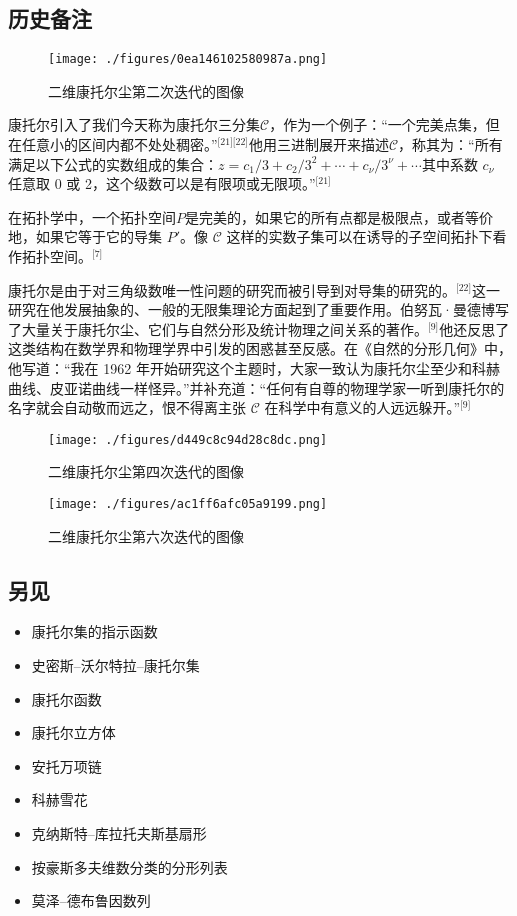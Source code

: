 \subsection{历史备注}
\begin{figure}[ht]
\centering
\texttt{[image: ./figures/0ea146102580987a.png]}
\caption{二维康托尔尘第二次迭代的图像} \label{fig_KTRJ_7}
\end{figure}
康托尔引入了我们今天称为康托尔三分集$\mathcal{C}$，作为一个例子：“一个完美点集，但在任意小的区间内都不处处稠密。”\(^\text{[21][22]}\)他用三进制展开来描述$\mathcal{C}$，称其为：“所有满足以下公式的实数组成的集合：$z = c_1/3 + c_2/3^2 + \cdots + c_\nu/3^\nu + \cdots$其中系数 $c_\nu$ 任意取 0 或 2，这个级数可以是有限项或无限项。”\(^\text{[21]}\)

在拓扑学中，一个拓扑空间$P$是完美的，如果它的所有点都是极限点，或者等价地，如果它等于它的导集 $P'$。像 $\mathcal{C}$ 这样的实数子集可以在诱导的子空间拓扑下看作拓扑空间。\(^\text{[7]}\)

康托尔是由于对三角级数唯一性问题的研究而被引导到对导集的研究的。\(^\text{[22]}\)这一研究在他发展抽象的、一般的无限集理论方面起到了重要作用。伯努瓦·曼德博写了大量关于康托尔尘、它们与自然分形及统计物理之间关系的著作。\(^\text{[9]}\)他还反思了这类结构在数学界和物理学界中引发的困惑甚至反感。在《自然的分形几何》中，他写道：“我在 1962 年开始研究这个主题时，大家一致认为康托尔尘至少和科赫曲线、皮亚诺曲线一样怪异。”并补充道：“任何有自尊的物理学家一听到康托尔的名字就会自动敬而远之，恨不得离主张 $\mathcal{C}$ 在科学中有意义的人远远躲开。”\(^\text{[9]}\)
\begin{figure}[ht]
\centering
\texttt{[image: ./figures/d449c8c94d28c8dc.png]}
\caption{二维康托尔尘第四次迭代的图像} \label{fig_KTRJ_8}
\end{figure}
\begin{figure}[ht]
\centering
\texttt{[image: ./figures/ac1ff6afc05a9199.png]}
\caption{二维康托尔尘第六次迭代的图像} \label{fig_KTRJ_9}
\end{figure}
\subsection{另见}
\begin{itemize}
\item 康托尔集的指示函数
\item 史密斯–沃尔特拉–康托尔集
\item 康托尔函数
\item 康托尔立方体
\item 安托万项链
\item 科赫雪花
\item 克纳斯特–库拉托夫斯基扇形
\item 按豪斯多夫维数分类的分形列表
\item 莫泽–德布鲁因数列
\end{itemize}
